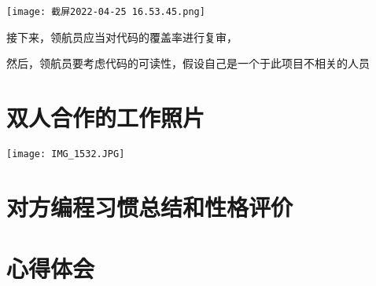 \documentclass{article}
\begin{document}
\begin{center}
	\texttt{[image: 截屏2022-04-25 16.53.45.png]}
\end{center}

接下来，领航员应当对代码的覆盖率进行复审，

然后，领航员要考虑代码的可读性，假设自己是一个于此项目不相关的人员





\section{双人合作的工作照片}
\centerline{\texttt{[image: IMG\_1532.JPG]}}
\section{对方编程习惯总结和性格评价}
\section{心得体会}
\end{document}
